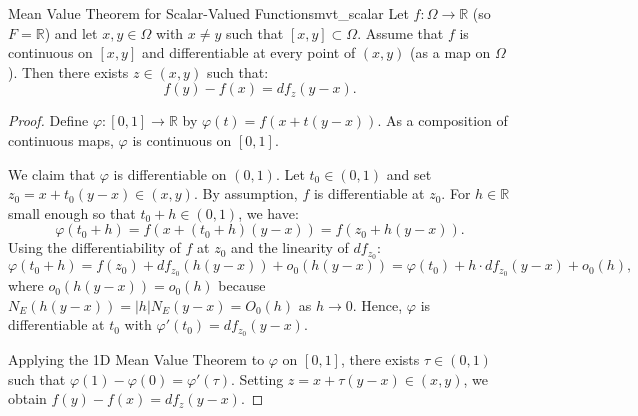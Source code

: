 \documentclass[11pt, a4paper]{article}
\newcommand{\R}{\mathbb{R}}
\begin{document}
\begin{proposition}{Mean Value Theorem for Scalar-Valued Functions}{mvt_scalar}
Let $f: \Omega \to \R$ (so $F = \R$) and let $x, y \in \Omega$ with $x \neq y$ such that $[x, y] \subset \Omega$. Assume that $f$ is continuous on $[x, y]$ and differentiable at every point of $(x, y)$ (as a map on $\Omega$). Then there exists $z \in (x, y)$ such that:
\[
f(y) - f(x) = df_z(y - x).
\]
\end{proposition}
\begin{proof}
Define $\varphi: [0, 1] \to \R$ by $\varphi(t) = f(x + t(y - x))$. As a composition of continuous maps, $\varphi$ is continuous on $[0, 1]$.

We claim that $\varphi$ is differentiable on $(0, 1)$. Let $t_0 \in (0, 1)$ and set $z_0 = x + t_0(y - x) \in (x, y)$. By assumption, $f$ is differentiable at $z_0$. For $h \in \R$ small enough so that $t_0 + h \in (0, 1)$, we have:
\[
\varphi(t_0 + h) = f(x + (t_0 + h)(y - x)) = f(z_0 + h(y - x)).
\]
Using the differentiability of $f$ at $z_0$ and the linearity of $df_{z_0}$:
\[
\varphi(t_0 + h) = f(z_0) + df_{z_0}(h(y - x)) + o_0(h(y - x)) = \varphi(t_0) + h \cdot df_{z_0}(y - x) + o_0(h),
\]
where $o_0(h(y - x)) = o_0(h)$ because $N_E(h(y - x)) = |h| N_E(y - x) = O_0(h)$ as $h \to 0$. Hence, $\varphi$ is differentiable at $t_0$ with $\varphi'(t_0) = df_{z_0}(y - x)$.

Applying the 1D Mean Value Theorem to $\varphi$ on $[0, 1]$, there exists $\tau \in (0, 1)$ such that $\varphi(1) - \varphi(0) = \varphi'(\tau)$. Setting $z = x + \tau(y - x) \in (x, y)$, we obtain $f(y) - f(x) = df_z(y - x)$.
\end{proof}
\end{document}
